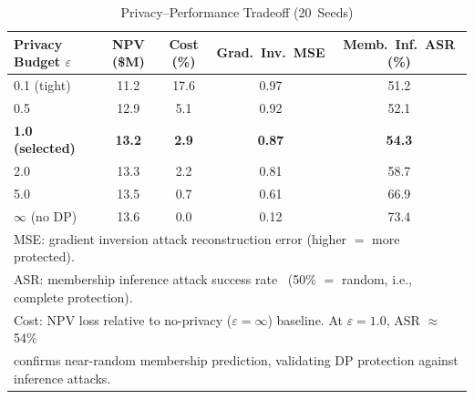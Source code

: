 \documentclass[journal]{IEEEtran}
\begin{document}
\begin{table}[t]
\caption{Privacy--Performance Tradeoff (20~Seeds)}
\label{tab:privacy}
\centering
\small
\begin{tabular}{lcccc}
\toprule
\textbf{Privacy Budget} $\varepsilon$ &
\textbf{NPV (\$M)} & \textbf{Cost (\%)} &
\textbf{Grad.\ Inv.\ MSE} & \textbf{Memb.\ Inf.\ ASR (\%)} \\
\midrule
0.1 (tight)             & 11.2 & 17.6 & 0.97 & 51.2 \\
0.5                     & 12.9 &  5.1 & 0.92 & 52.1 \\
\textbf{1.0 (selected)} & \textbf{13.2} & \textbf{2.9} & \textbf{0.87} & \textbf{54.3} \\
2.0                     & 13.3 &  2.2 & 0.81 & 58.7 \\
5.0                     & 13.5 &  0.7 & 0.61 & 66.9 \\
$\infty$ (no DP)        & 13.6 &  0.0 & 0.12 & 73.4 \\
\bottomrule
\multicolumn{5}{l}{\footnotesize MSE: gradient inversion attack reconstruction error (higher $=$ more protected).}\\
\multicolumn{5}{l}{\footnotesize ASR: membership inference attack success rate~\cite{shokri2017membership} (50\% $=$ random, i.e., complete protection).}\\
\multicolumn{5}{l}{\footnotesize Cost: NPV loss relative to no-privacy ($\varepsilon{=}\infty$) baseline. At $\varepsilon{=}1.0$, ASR $\approx$ 54\%}\\
\multicolumn{5}{l}{\footnotesize confirms near-random membership prediction, validating DP protection against inference attacks.}
\end{tabular}
\end{table}
\end{document}
